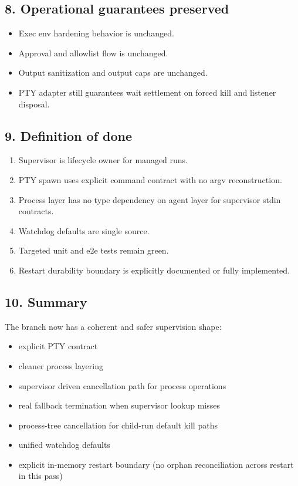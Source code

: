 \subsection{8. Operational guarantees preserved}


\begin{itemize}
  \item Exec env hardening behavior is unchanged.
  \item Approval and allowlist flow is unchanged.
  \item Output sanitization and output caps are unchanged.
  \item PTY adapter still guarantees wait settlement on forced kill and listener disposal.
\end{itemize}


\subsection{9. Definition of done}


\begin{enumerate}
  \item Supervisor is lifecycle owner for managed runs.
  \item PTY spawn uses explicit command contract with no argv reconstruction.
  \item Process layer has no type dependency on agent layer for supervisor stdin contracts.
  \item Watchdog defaults are single source.
  \item Targeted unit and e2e tests remain green.
  \item Restart durability boundary is explicitly documented or fully implemented.
\end{enumerate}


\subsection{10. Summary}


The branch now has a coherent and safer supervision shape:

\begin{itemize}
  \item explicit PTY contract
  \item cleaner process layering
  \item supervisor driven cancellation path for process operations
  \item real fallback termination when supervisor lookup misses
  \item process-tree cancellation for child-run default kill paths
  \item unified watchdog defaults
  \item explicit in-memory restart boundary (no orphan reconciliation across restart in this pass)
\end{itemize}



